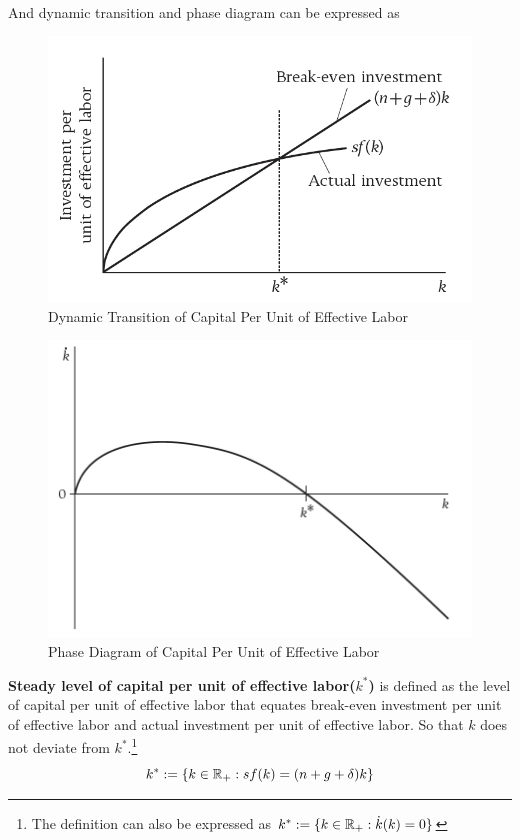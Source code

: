 \documentclass[]{article}
\begin{document}
			\paragraph{} And dynamic transition and phase diagram can be expressed as
			\begin{figure}[h]
				\centering
				\includegraphics[width=0.6\linewidth]{figures/3_1.png}
				\caption{Dynamic Transition of Capital Per Unit of Effective Labor}
			\end{figure}
			
			\begin{figure}[h]
				\centering
				\includegraphics[width=0.6\linewidth]{figures/3_2.png}
				\caption{Phase Diagram of Capital Per Unit of Effective Labor}
			\end{figure}
			
			\newpage 
			
			\begin{definition}
			\textbf{Steady level of capital per unit of effective labor($k^*$)} is defined as the level of capital per unit of effective labor that equates break-even investment per unit of effective labor and actual investment per unit of effective labor. So that $k$ does not deviate from $k^*$.\footnote{The definition can also be expressed as $k^* := \{k \in \mathbb{R}_{+}: \dot{k}(k) = 0\}$}
				\[
					k^* := \{k \in \mathbb{R}_{+}: sf(k) = (n+g+\delta) k\}
				\]
			\end{definition}
			
\end{document}
